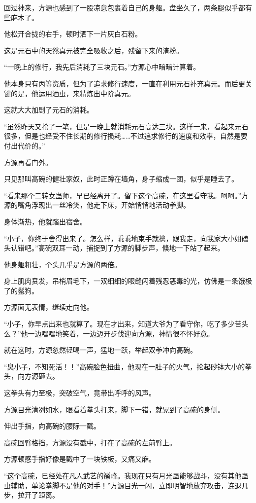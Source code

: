\begin{this_body}
回过神来，方源也感到了一股凉意包裹着自己的身躯。盘坐久了，两条腿似乎都有些麻木了。

他松开合拢的右手，顿时洒下一片灰白石粉。

这是元石中的天然真元被完全吸收之后，残留下来的渣粉。

“一晚上的修行，我先后消耗了三块元石。”方源心中暗暗计算着。

他本身只有丙等资质，但为了追求修行速度，一直在利用元石补充真元。而后更关键的是，他运用酒虫，来精炼出中阶真元。

这就大大加剧了元石的消耗。

“虽然昨天又抢了一笔，但是一晚上就消耗元石高达三块。这样一来，看起来元石很多，但是也经受不住长期的修行损耗……不过追求修行的速度和效率，自然是要付出代价的。”

方源再看门外。

只见那叫高碗的健壮家奴，此时正蹲在墙角，身子缩成一团，似乎是睡去了。

“看来那个二转女蛊师，早已经离开了。留下这个高碗，在这里看守我。呵呵。”方源的嘴角浮现出一丝冷笑，他走下床，开始悄悄地活动拳脚。

身体渐热，他就踏出宿舍。

“小子，你终于舍得出来了。怎么样，乖乖地束手就擒，跟我走，向我家大小姐磕头认错吧。”高碗双耳一动，捕捉到了方源的脚步声，倏地一下站了起来。

他身躯粗壮，个头几乎是方源的两倍。

身上肌肉贲发，吊梢眉毛下，一双细细的眼缝闪着残忍恶毒的光，仿佛是一条饿极了的鬣狗。

方源面无表情，继续走向他。

“小子，你早点出来也就算了。现在才出来，知道大爷为了看守你，吃了多少苦头么？”他一边嘿嘿地笑着，一边迈开步伐迎向方源，神情很不怀好意。

就在这时，方源忽然轻喝一声，猛地一跃，举起双拳冲向高碗。

“臭小子，不知死活！！”高碗脸色扭曲，他现在一肚子的火气，抡起砂钵大小的拳头，向方源砸去。

这拳头有力至极，突破空气，竟带出呼呼的风声。

方源目光清冽如水，眼看着拳头打来，脚下一错，就晃到了高碗的身侧。

伸出手指，向高碗的腰际一戳。

高碗回臂格挡，方源没有戳中，打在了高碗的左前臂上。

方源顿感手指好像是戳中了一块铁板，又痛又麻。

“这个高碗，已经处在凡人武艺的巅峰。我现在只有月光蛊能够战斗，没有其他蛊虫辅助，单论拳脚不是他的对手！”方源目光一闪，立即明智地放弃攻击，连退几步，拉开了距离。


\end{this_body}
